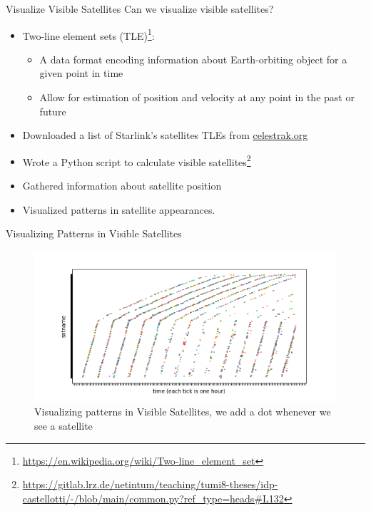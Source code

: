 \documentclass[NET,english,beameralt]{tumbeamer}
\begin{document}
\begin{frame}{Visualize Visible Satellites}
    Can we visualize visible satellites?
	\color{red}{should i add a TLE file in the next slide? I don't think it is too relevant}
    \begin{itemize}
        \item Two-line element sets (TLE)\footnote{\url{https://en.wikipedia.org/wiki/Two-line_element_set}}: 
        \begin{itemize} 
            \item A data format encoding information about Earth-orbiting object for a given point in time
            \item Allow for estimation of position and velocity at any point in the past or future
        \end{itemize}     
        \item Downloaded a list of Starlink's satellites TLEs from \href{celestrak.org}{celestrak.org}
        \item Wrote a Python script to calculate visible
        satellites\footnote{\url{https://gitlab.lrz.de/netintum/teaching/tumi8-theses/idp-castellotti/-/blob/main/common.py?ref_type=heads\#L132}}
        \item Gathered information about satellite position
        \item Visualized patterns in satellite appearances.
    \end{itemize}
\end{frame}

\begin{frame}{Visualizing Patterns in Visible Satellites}
    \begin{figure}
        \includegraphics[width=1\textwidth]{pics/patterns-in-satellite-appearances.png}
        \caption{Visualizing patterns in Visible Satellites, we add a dot whenever we see a satellite}
    \end{figure}
\end{frame}
\end{document}
